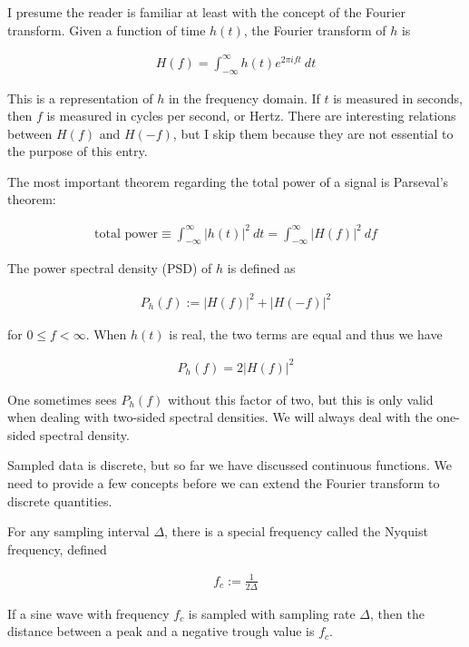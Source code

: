 \documentclass[a4paper, 12pt]{article}
\begin{document}
I presume the reader is familiar at least with the concept of the Fourier transform. Given a function of time $h(t)$, the Fourier transform of $h$ is 

\begin{align*}
    H(f) = \int_{-\infty}^{\infty} h(t) e^{2\pi i f t} ~ dt
\end{align*}

This is a representation of $h$ in the frequency domain. If $t$ is measured in
seconds, then $f$ is measured in cycles per second, or Hertz. There are
interesting relations between $H(f)$ and $H(-f)$, but I skip them because they
are not essential to the purpose of this entry.

The most important theorem regarding the total power of a signal is Parseval's theorem: 

\begin{align*}
    \text{total power} \equiv \int_{-\infty}^{\infty} |h(t)|^2 ~ dt = \int_{-\infty}^{\infty} |H(f)|^2 ~ df
\end{align*}



The power spectral density (PSD) of $h$ is defined as 

\begin{align*}
    P_h(f) := |H(f)|^2 + |H(-f)|^2  
\end{align*}

for $0\leq f  < \infty$. When $h(t)$ is real, the two terms are equal and thus we have 

\begin{align*}
    P_h(f) = 2|H(f)|^2
\end{align*}

One sometimes sees $P_h(f)$ without this factor of two, but this is only valid
when dealing with two-sided spectral densities. We will always deal with the
one-sided spectral density.

Sampled data is discrete, but so far we have discussed continuous functions. We
need to provide a few concepts before we can extend the Fourier transform to
discrete quantities.

For any sampling interval $\Delta$, there is a special frequency called the
Nyquist frequency, defined 

\begin{align*}
    f_c := \frac{1}{2\Delta}
\end{align*}

If a sine wave with frequency $f_c$ is sampled with sampling rate $\Delta$,
then the distance between a peak and a negative trough value is $f_c$. 
\end{document}
